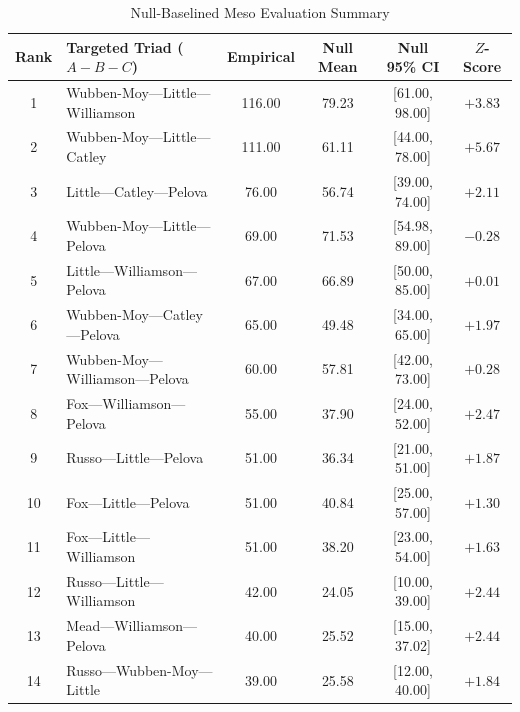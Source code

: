 \documentclass[12pt, a4paper]{article}
\begin{document}
\begin{table}[htbp]
    \centering
    \scriptsize
    \setlength{\tabcolsep}{3pt} %
    \caption{Null-Baselined Meso Evaluation Summary}
    \label{tab:null_meso_summary}
    \begin{tabularx}{\textwidth}{c X c c c c}
        \toprule
        \textbf{Rank} & \textbf{Targeted Triad ($A - B - C$)} & \textbf{Empirical} & \textbf{Null Mean} & \textbf{Null 95\% CI} & \textbf{$Z$-Score} \\
        \midrule
        1  & Wubben-Moy---\allowbreak Little---\allowbreak Williamson & 116.00 & 79.23 & [61.00, 98.00] & $+3.83$ \\
        2  & Wubben-Moy---\allowbreak Little---\allowbreak Catley     & 111.00 & 61.11 & [44.00, 78.00] & $+5.67$ \\
        3  & Little---\allowbreak Catley---\allowbreak Pelova         & 76.00  & 56.74 & [39.00, 74.00] & $+2.11$ \\
        4  & Wubben-Moy---\allowbreak Little---\allowbreak Pelova     & 69.00  & 71.53 & [54.98, 89.00] & $-0.28$ \\
        5  & Little---\allowbreak Williamson---\allowbreak Pelova     & 67.00  & 66.89 & [50.00, 85.00] & $+0.01$ \\
        6  & Wubben-Moy---\allowbreak Catley---\allowbreak Pelova     & 65.00  & 49.48 & [34.00, 65.00] & $+1.97$ \\
        7  & Wubben-Moy---\allowbreak Williamson---\allowbreak Pelova & 60.00  & 57.81 & [42.00, 73.00] & $+0.28$ \\
        8  & Fox---\allowbreak Williamson---\allowbreak Pelova        & 55.00  & 37.90 & [24.00, 52.00] & $+2.47$ \\
        9  & Russo---\allowbreak Little---\allowbreak Pelova          & 51.00  & 36.34 & [21.00, 51.00] & $+1.87$ \\
        10 & Fox---\allowbreak Little---\allowbreak Pelova            & 51.00  & 40.84 & [25.00, 57.00] & $+1.30$ \\
        11 & Fox---\allowbreak Little---\allowbreak Williamson        & 51.00  & 38.20 & [23.00, 54.00] & $+1.63$ \\
        12 & Russo---\allowbreak Little---\allowbreak Williamson      & 42.00  & 24.05 & [10.00, 39.00] & $+2.44$ \\
        13 & Mead---\allowbreak Williamson---\allowbreak Pelova       & 40.00  & 25.52 & [15.00, 37.02] & $+2.44$ \\
        14 & Russo---\allowbreak Wubben-Moy---\allowbreak Little      & 39.00  & 25.58 & [12.00, 40.00] & $+1.84$ \\

\end{tabularx}
\end{table}
\end{document}
